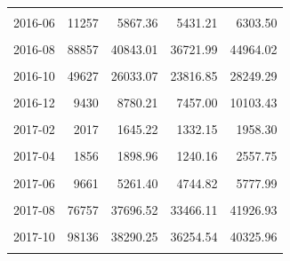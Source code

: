 \begin{longtable}[t]{crrrr}
\cellcolor{gray!10}{2016-05} & \cellcolor{gray!10}{6209} & \cellcolor{gray!10}{3413.57} & \cellcolor{gray!10}{3104.45} & \cellcolor{gray!10}{3722.70}\\
2016-06 & 11257 & 5867.36 & 5431.21 & 6303.50\\
\cellcolor{gray!10}{2016-07} & \cellcolor{gray!10}{30233} & \cellcolor{gray!10}{18094.71} & \cellcolor{gray!10}{13974.74} & \cellcolor{gray!10}{22214.68}\\
2016-08 & 88857 & 40843.01 & 36721.99 & 44964.02\\
\cellcolor{gray!10}{2016-09} & \cellcolor{gray!10}{95945} & \cellcolor{gray!10}{44767.35} & \cellcolor{gray!10}{42122.15} & \cellcolor{gray!10}{47412.56}\\
2016-10 & 49627 & 26033.07 & 23816.85 & 28249.29\\
\cellcolor{gray!10}{2016-11} & \cellcolor{gray!10}{26459} & \cellcolor{gray!10}{17311.30} & \cellcolor{gray!10}{15911.18} & \cellcolor{gray!10}{18711.43}\\
2016-12 & 9430 & 8780.21 & 7457.00 & 10103.43\\
\cellcolor{gray!10}{2017-01} & \cellcolor{gray!10}{3627} & \cellcolor{gray!10}{2920.08} & \cellcolor{gray!10}{2541.17} & \cellcolor{gray!10}{3299.00}\\
2017-02 & 2017 & 1645.22 & 1332.15 & 1958.30\\
\cellcolor{gray!10}{2017-03} & \cellcolor{gray!10}{1859} & \cellcolor{gray!10}{1994.75} & \cellcolor{gray!10}{1654.51} & \cellcolor{gray!10}{2334.98}\\
2017-04 & 1856 & 1898.96 & 1240.16 & 2557.75\\
\cellcolor{gray!10}{2017-05} & \cellcolor{gray!10}{4859} & \cellcolor{gray!10}{2790.65} & \cellcolor{gray!10}{2404.53} & \cellcolor{gray!10}{3176.77}\\
2017-06 & 9661 & 5261.40 & 4744.82 & 5777.99\\
\cellcolor{gray!10}{2017-07} & \cellcolor{gray!10}{23567} & \cellcolor{gray!10}{14915.92} & \cellcolor{gray!10}{12795.79} & \cellcolor{gray!10}{17036.05}\\
2017-08 & 76757 & 37696.52 & 33466.11 & 41926.93\\
\cellcolor{gray!10}{2017-09} & \cellcolor{gray!10}{202308} & \cellcolor{gray!10}{70396.10} & \cellcolor{gray!10}{66948.57} & \cellcolor{gray!10}{73843.63}\\
2017-10 & 98136 & 38290.25 & 36254.54 & 40325.96\\
\cellcolor{gray!10}{2017-11} & \cellcolor{gray!10}{31821} & \cellcolor{gray!10}{18420.87} & \cellcolor{gray!10}{17073.66} & \cellcolor{gray!10}{19768.07}\\

\end{longtable}
